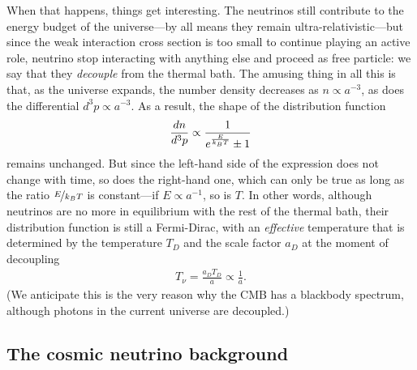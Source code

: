 When that happens, things get interesting. The neutrinos still contribute to the
energy budget of the universe---by all means they remain ultra-relativistic---but
since the weak interaction cross section is too small to continue playing an active
role, neutrino stop interacting with anything else and proceed as free
particle: we say that they \emph{decouple} from the thermal bath.
The amusing thing in all this is that, as the universe expands, the number density
decreases as $n \propto a^{-3}$, as does the differential $d^3p \propto a^{-3}$.
As a result, the shape of the distribution function
\begin{align*}
  \frac{dn}{d^3p} \propto \frac{1}{e^\frac{E}{k_B T} \pm 1}
\end{align*}
remains unchanged. But since the left-hand side of the expression does not change
with time, so does the right-hand one, which can only be true as long as the ratio
$\nicefrac{E}{k_B T}$ is constant---if $E\propto a^{-1}$, so is $T$. In other words,
although neutrinos are no more in equilibrium with the rest of the thermal bath,
their distribution function is still a Fermi-Dirac, with an \emph{effective} temperature
that is determined by the temperature $T_D$ and the scale factor $a_D$ at the moment of
decoupling
\begin{align}
  T_\nu = \frac{a_D T_D}{a} \propto \frac{1}{a}.
\end{align}
(We anticipate this is the very reason why the CMB has a blackbody spectrum, although
photons in the current universe are decoupled.)



\subsection{The cosmic neutrino background}

